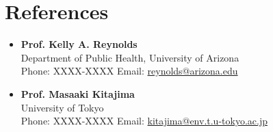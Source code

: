 \documentclass[11pt,a4paper]{article}
\begin{document}
\vspace{10pt}

\section{References}

\begin{itemize}[leftmargin=1.5em, nosep]
    \item \textbf{Prof. Kelly A. Reynolds} \\
    Department of Public Health, University of Arizona \\
    Phone: XXXX-XXXX \quad Email: \href{mailto:reynolds@arizona.edu}{reynolds@arizona.edu}

    \vspace{5pt}

    \item \textbf{Prof. Masaaki Kitajima} \\
    University of Tokyo \\
    Phone: XXXX-XXXX \quad Email: \href{mailto:kitajima@env.t.u-tokyo.ac.jp}{kitajima@env.t.u-tokyo.ac.jp}
\end{itemize}
\end{document}
